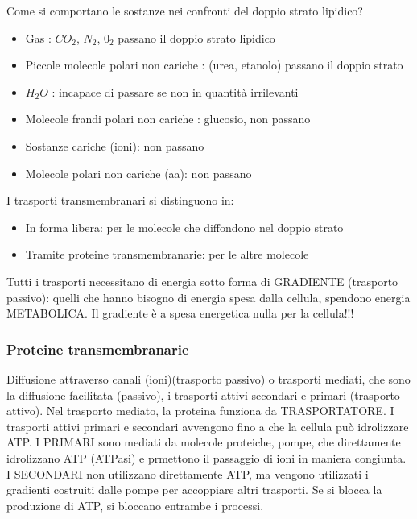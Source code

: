 \documentclass[a4paper,12pt]{article}
\begin{document}
Come si comportano le sostanze nei confronti del doppio strato lipidico?
\begin{itemize}
\item{Gas : $CO_{2}$, $N_{2}$, $0_{2}$ passano il doppio strato lipidico}
\item{Piccole molecole polari non cariche : (urea, etanolo) passano il doppio strato}
\item{$H_{2}O$ : incapace di passare se non in quantità irrilevanti}
\item{Molecole frandi polari non cariche : glucosio, non passano}
\item{Sostanze cariche (ioni): non passano}
\item{Molecole polari non cariche (aa): non passano}
\end{itemize}

I trasporti transmembranari si distinguono in:
\begin{itemize}
\item{In forma libera: per le molecole che diffondono nel doppio strato}
\item{Tramite proteine transmembranarie: per le altre molecole}
\end{itemize}
Tutti i trasporti necessitano di energia sotto forma di GRADIENTE (trasporto passivo): quelli che hanno bisogno di energia spesa dalla cellula, spendono energia METABOLICA. Il gradiente è a spesa energetica nulla per la cellula!!!

\subsubsection{Proteine transmembranarie}
 
Diffusione attraverso canali (ioni)(trasporto passivo) o trasporti mediati, che sono la diffusione facilitata (passivo), i trasporti attivi secondari e primari (trasporto attivo).
Nel trasporto mediato, la proteina funziona da TRASPORTATORE. I trasporti attivi primari e secondari avvengono fino a che la cellula può idrolizzare ATP. 
I PRIMARI sono mediati da molecole proteiche, pompe, che direttamente idrolizzano ATP (ATPasi) e prmettono il passaggio di ioni in maniera congiunta. 
I SECONDARI non utilizzano direttamente ATP, ma vengono utilizzati i gradienti costruiti dalle pompe per accoppiare altri trasporti.
Se si blocca la produzione di ATP, si bloccano entrambe i processi.
\end{document}
